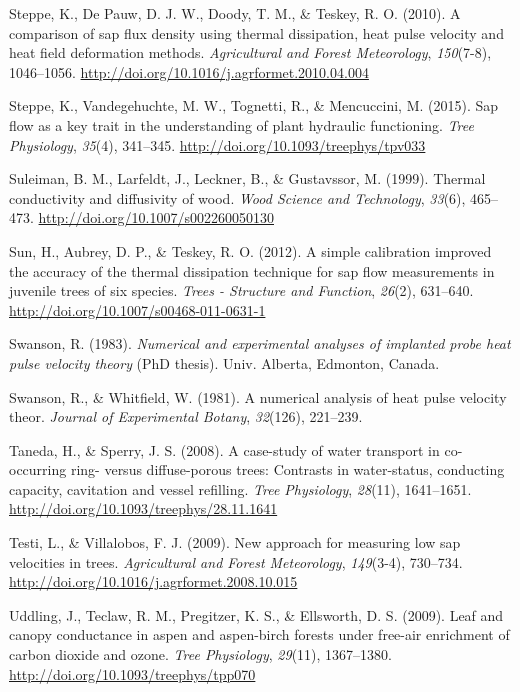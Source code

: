 \documentclass[11pt,twoside]{reedthesis}
\begin{document}
\hypertarget{ref-Steppe2010}{}
Steppe, K., De Pauw, D. J. W., Doody, T. M., \& Teskey, R. O. (2010). A
comparison of sap flux density using thermal dissipation, heat pulse
velocity and heat field deformation methods. \emph{Agricultural and
Forest Meteorology}, \emph{150}(7-8), 1046--1056.
\url{http://doi.org/10.1016/j.agrformet.2010.04.004}

\hypertarget{ref-Steppe2015}{}
Steppe, K., Vandegehuchte, M. W., Tognetti, R., \& Mencuccini, M.
(2015). Sap flow as a key trait in the understanding of plant hydraulic
functioning. \emph{Tree Physiology}, \emph{35}(4), 341--345.
\url{http://doi.org/10.1093/treephys/tpv033}

\hypertarget{ref-Suleiman1999}{}
Suleiman, B. M., Larfeldt, J., Leckner, B., \& Gustavssor, M. (1999).
Thermal conductivity and diffusivity of wood. \emph{Wood Science and
Technology}, \emph{33}(6), 465--473.
\url{http://doi.org/10.1007/s002260050130}

\hypertarget{ref-Sun2012}{}
Sun, H., Aubrey, D. P., \& Teskey, R. O. (2012). A simple calibration
improved the accuracy of the thermal dissipation technique for sap flow
measurements in juvenile trees of six species. \emph{Trees - Structure
and Function}, \emph{26}(2), 631--640.
\url{http://doi.org/10.1007/s00468-011-0631-1}

\hypertarget{ref-Swanson1983}{}
Swanson, R. (1983). \emph{Numerical and experimental analyses of
implanted probe heat pulse velocity theory} (PhD thesis). Univ. Alberta,
Edmonton, Canada.

\hypertarget{ref-Swanson1981}{}
Swanson, R., \& Whitfield, W. (1981). A numerical analysis of heat pulse
velocity theor. \emph{Journal of Experimental Botany}, \emph{32}(126),
221--239.

\hypertarget{ref-Taneda2008}{}
Taneda, H., \& Sperry, J. S. (2008). A case-study of water transport in
co-occurring ring- versus diffuse-porous trees: Contrasts in
water-status, conducting capacity, cavitation and vessel refilling.
\emph{Tree Physiology}, \emph{28}(11), 1641--1651.
\url{http://doi.org/10.1093/treephys/28.11.1641}

\hypertarget{ref-Testi2009}{}
Testi, L., \& Villalobos, F. J. (2009). New approach for measuring low
sap velocities in trees. \emph{Agricultural and Forest Meteorology},
\emph{149}(3-4), 730--734.
\url{http://doi.org/10.1016/j.agrformet.2008.10.015}

\hypertarget{ref-Uddling2009}{}
Uddling, J., Teclaw, R. M., Pregitzer, K. S., \& Ellsworth, D. S.
(2009). Leaf and canopy conductance in aspen and aspen-birch forests
under free-air enrichment of carbon dioxide and ozone. \emph{Tree
Physiology}, \emph{29}(11), 1367--1380.
\url{http://doi.org/10.1093/treephys/tpp070}
\end{document}
